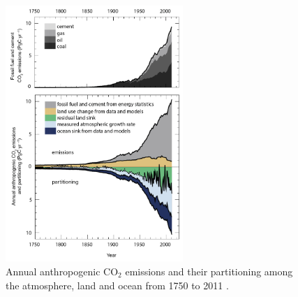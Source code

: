 \documentclass[11pt]{article}
\begin{document}




\begin{figure}[ht]
    \centering
    \includegraphics[width=0.6\textwidth]{ipcc_fig6_8.jpg}
    \caption{Annual anthropogenic CO\(_{2}\) emissions and their partitioning among the atmosphere, land and ocean from 1750 to 2011  \citep{ciais2014carbon}.}
    \label{fig:ipcc_fig6.8}
\end{figure}

\end{document}
